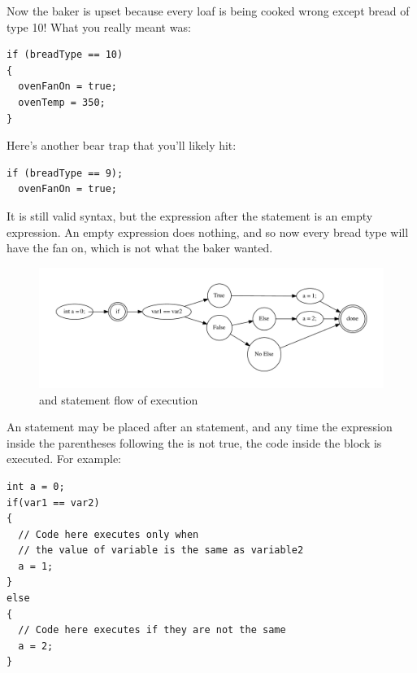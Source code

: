 Now the baker is upset because every loaf is being cooked wrong except bread of type 10!
What you really meant was: 

\noindent\begin{minipage}{\linewidth}\begin{lstlisting}
if (breadType == 10)
{
  ovenFanOn = true;
  ovenTemp = 350;
}
\end{lstlisting}\end{minipage}

Here's another bear trap that you'll likely hit:

\noindent\begin{minipage}{\linewidth}\begin{lstlisting}
if (breadType == 9);
  ovenFanOn = true;
\end{lstlisting}\end{minipage}

It is still valid syntax, but the expression after the  statement is an empty expression.
An empty expression does nothing, and so now every bread type will have the fan on, which is not what the baker wanted.




\begin{figure}[tb]
  \centering
  \includegraphics[width=\textwidth]{diagrams/if-flow.pdf}
  \caption{ and  statement flow of execution} \label{fig-if-flowchart}
\end{figure}


An  statement may be placed after an  statement, and any time the expression inside the parentheses following the  is not true, the code inside the  block is executed. 
For example: \nopagebreak[4]

\noindent\begin{minipage}{\linewidth}\begin{lstlisting}
int a = 0;
if(var1 == var2)
{
  // Code here executes only when
  // the value of variable is the same as variable2
  a = 1;
}
else
{
  // Code here executes if they are not the same
  a = 2;
}
\end{lstlisting}\end{minipage}

